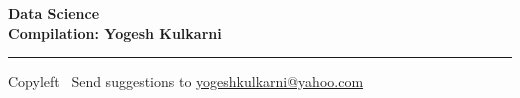 
\graphicspath{{images/}}



\footnotesize


\begin{center}
\Large{\textbf{Data Science\\ Compilation: Yogesh Kulkarni}}  
\end{center}

\begin{multicols}{2}

\end{multicols}

\rule{\linewidth}{0.25pt}
\scriptsize
Copyleft \textcopyleft\  Send suggestions to 
\href{http://www.yogeshkulkarni.com}{yogeshkulkarni@yahoo.com}


